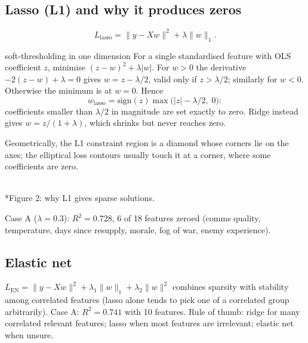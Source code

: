 \documentclass[11pt]{article}
\begin{document}
\subsection{Lasso (L1) and why it produces zeros}
\[L_{\text{lasso}}=\|y-Xw\|^2+\lambda\|w\|_1.\]
\begin{derivation}{soft-thresholding in one dimension}
For a single standardised feature with OLS coefficient $z$, minimise $(z-w)^2+\lambda|w|$. For $w>0$ the derivative $-2(z-w)+\lambda=0$ gives $w=z-\lambda/2$, valid only if $z>\lambda/2$; similarly for $w<0$. Otherwise the minimum is at $w=0$. Hence
\[w_{\text{lasso}}=\text{sign}(z)\max\big(|z|-\lambda/2,\;0\big):\]
coefficients smaller than $\lambda/2$ in magnitude are set exactly to zero. Ridge instead gives $w=z/(1+\lambda)$, which shrinks but never reaches zero.
\end{derivation}
Geometrically, the L1 constraint region is a diamond whose corners lie on the axes; the elliptical loss contours usually touch it at a corner, where some coefficients are zero.
\begin{center}\\*{\small\color{GreyN}Figure 2: why L1 gives sparse solutions.}\end{center}
Case A ($\lambda=0.3$): $R^2=0.728$, 6 of 18 features zeroed (comms quality, temperature, days since resupply, morale, fog of war, enemy experience).

\subsection{Elastic net}
$L_{\text{EN}}=\|y-Xw\|^2+\lambda_1\|w\|_1+\lambda_2\|w\|^2$ combines sparsity with stability among correlated features (lasso alone tends to pick one of a correlated group arbitrarily). Case A: $R^2=0.741$ with 10 features. Rule of thumb: ridge for many correlated relevant features; lasso when most features are irrelevant; elastic net when unsure.
\end{document}

